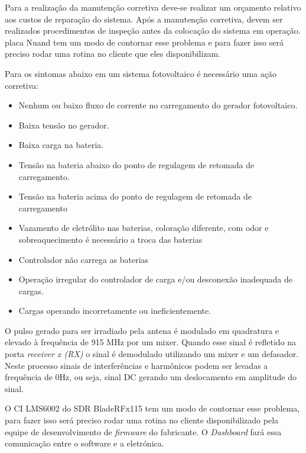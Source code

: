 Para a realização da manutenção corretiva deve-se realizar um orçamento relativo aos custos de reparação do sistema. Após a manutenção corretiva, devem ser realizados procedimentos de inspeção antes da colocação do sistema em operação.
 placa Nuand tem um modo de contornar esse problema e para fazer isso será preciso rodar uma rotina no cliente que eles disponibilizam. 

Para os sintomas abaixo em um sistema fotovoltaico é necessário uma ação corretiva:
\begin{itemize}
    \item Nenhum ou baixo fluxo de corrente no carregamento do gerador fotovoltaico.
    \item Baixa tensão no gerador.
    \item Baixa carga na bateria.
    \item Tensão na bateria abaixo do ponto de regulagem de retomada de carregamento.
    \item Tensão na bateria acima do ponto de regulagem de retomada de carregamento
    \item Vazamento de eletrólito nas baterias, coloração diferente, com odor e
sobreaquecimento é necessário a troca das baterias
    \item Controlador não carrega as baterias
    \item Operação irregular do controlador de carga e/ou desconexão inadequada de cargas.
    \item Cargas operando incorretamente ou ineficientemente. 
\end{itemize}


O pulso gerado para ser irradiado pela antena é modulado em quadratura e elevado à frequência de 915 MHz por um mixer. Quando esse sinal é refletido na porta \emph{receiver x (RX)} o sinal é demodulado utilizando um mixer e um defasador. Neste processo sinais de interferências e harmônicos podem ser levadas a frequência de 0Hz, ou seja, sinal DC gerando um deslocamento em amplitude do sinal.

O CI LMS6002 do SDR BladeRFx115 tem um modo de contornar esse problema, para fazer isso será preciso rodar uma rotina no cliente  disponibilizado pela equipe de desenvolvimento de \emph{firmware} do fabricante. O  \textit{Dashboard} fará essa comunicação entre o software e a eletrónica. 

